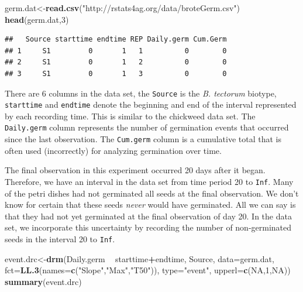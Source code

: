 \documentclass[letterpaper,]{book}
\newenvironment{Shaded}{\begin{snugshade}}{\end{snugshade}}
\newcommand{\DataTypeTok}[1]{\textcolor[rgb]{0.13,0.29,0.53}{#1}}
\newcommand{\DecValTok}[1]{\textcolor[rgb]{0.00,0.00,0.81}{#1}}
\newcommand{\KeywordTok}[1]{\textcolor[rgb]{0.13,0.29,0.53}{\textbf{#1}}}
\newcommand{\NormalTok}[1]{#1}
\newcommand{\OperatorTok}[1]{\textcolor[rgb]{0.81,0.36,0.00}{\textbf{#1}}}
\newcommand{\OtherTok}[1]{\textcolor[rgb]{0.56,0.35,0.01}{#1}}
\newcommand{\StringTok}[1]{\textcolor[rgb]{0.31,0.60,0.02}{#1}}
\begin{document}
\begin{Shaded}
\begin{Highlighting}[]
\NormalTok{germ.dat<-}\KeywordTok{read.csv}\NormalTok{(}\StringTok{"http://rstats4ag.org/data/broteGerm.csv"}\NormalTok{)}
\KeywordTok{head}\NormalTok{(germ.dat,}\DecValTok{3}\NormalTok{)}
\end{Highlighting}
\end{Shaded}

\begin{verbatim}
##   Source starttime endtime REP Daily.germ Cum.Germ
## 1     S1         0       1   1          0        0
## 2     S1         0       1   2          0        0
## 3     S1         0       1   3          0        0
\end{verbatim}

There are 6 columns in the data set, the \texttt{Source} is the \emph{B. tectorum} biotype, \texttt{starttime} and \texttt{endtime} denote the beginning and end of the interval represented by each recording time. This is similar to the chickweed data set. The \texttt{Daily.germ} column represents the number of germination events that occurred since the last observation. The \texttt{Cum.germ} column is a cumulative total that is often used (incorrectly) for analyzing germination over time.

The final observation in this experiment occurred 20 days after it began. Therefore, we have an interval in the data set from time period 20 to \texttt{Inf}. Many of the petri dishes had not germinated all seeds at the final observation. We don't know for certain that these seeds \emph{never} would have germinated. All we can say is that they had not yet germinated at the final observation of day 20. In the data set, we incorporate this uncertainty by recording the number of non-germinated seeds in the interval 20 to \texttt{Inf}.



\begin{Shaded}
\begin{Highlighting}[]
\NormalTok{event.drc<-}\KeywordTok{drm}\NormalTok{(Daily.germ }\OperatorTok{~}\StringTok{ }\NormalTok{starttime}\OperatorTok{+}\NormalTok{endtime, Source, }\DataTypeTok{data=}\NormalTok{germ.dat, }
               \DataTypeTok{fct=}\KeywordTok{LL.3}\NormalTok{(}\DataTypeTok{names=}\KeywordTok{c}\NormalTok{(}\StringTok{"Slope"}\NormalTok{,}\StringTok{"Max"}\NormalTok{,}\StringTok{"T50"}\NormalTok{)), }\DataTypeTok{type=}\StringTok{"event"}\NormalTok{,}
               \DataTypeTok{upperl=}\KeywordTok{c}\NormalTok{(}\OtherTok{NA}\NormalTok{,}\DecValTok{1}\NormalTok{,}\OtherTok{NA}\NormalTok{))}
\KeywordTok{summary}\NormalTok{(event.drc)}
\end{Highlighting}
\end{Shaded}
\end{document}
